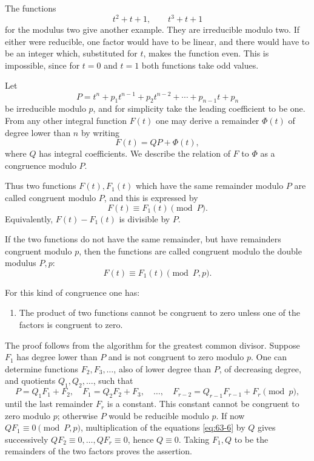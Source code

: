 \documentclass[11pt,a4paper]{article}
\begin{document}
The functions
\[
 t^2+t+1,
 \qquad t^3+t+1
\]
for the modulus two give another example.  They are irreducible modulo two.  If either were reducible, one factor would have to be linear, and there would have to be an integer which, substituted for \(t\), makes the function even.  This is impossible, since for \(t=0\) and \(t=1\) both functions take odd values.

Let
\begin{equation}\label{eq:63-3}
 P=t^n+p_1t^{n-1}+p_2t^{n-2}+\cdots+p_{n-1}t+p_n
\end{equation}
be irreducible modulo \(p\), and for simplicity take the leading coefficient to be one.  From any other integral function \(F(t)\) one may derive a remainder \(\Phi(t)\) of degree lower than \(n\) by writing
\begin{equation}\label{eq:63-4}
 F(t)=QP+\Phi(t),
\end{equation}
where \(Q\) has integral coefficients.  We describe the relation of \(F\) to \(\Phi\) as a congruence modulo \(P\).

Thus two functions \(F(t),F_1(t)\) which have the same remainder modulo \(P\) are called congruent modulo \(P\), and this is expressed by
\[
 F(t)\equiv F_1(t)\pmod P.
\]
Equivalently, \(F(t)-F_1(t)\) is divisible by \(P\).

If the two functions do not have the same remainder, but have remainders congruent modulo \(p\), then the functions are called congruent modulo the double modulus \(P,p\):
\begin{equation}\label{eq:63-5}
 F(t)\equiv F_1(t)\pmod{P,p}.
\end{equation}

For this kind of congruence one has:

\begin{enumerate}[label=\arabic*.]
\item The product of two functions cannot be congruent to zero unless one of the factors is congruent to zero.
\end{enumerate}
The proof follows from the algorithm for the greatest common divisor.  Suppose \(F_1\) has degree lower than \(P\) and is not congruent to zero modulo \(p\).  One can determine functions \(F_2,F_3,\ldots\), also of lower degree than \(P\), of decreasing degree, and quotients \(Q_1,Q_2,\ldots\), such that
\begin{equation}\label{eq:63-6}
 P=Q_1F_1+F_2,
 \quad F_1=Q_2F_2+F_3,
 \quad\ldots,
 \quad F_{r-2}=Q_{r-1}F_{r-1}+F_r
 \pmod p,
\end{equation}
until the last remainder \(F_r\) is a constant.  This constant cannot be congruent to zero modulo \(p\); otherwise \(P\) would be reducible modulo \(p\).  If now \(QF_1\equiv0\pmod{P,p}\), multiplication of the equations \eqref{eq:63-6} by \(Q\) gives successively \(QF_2\equiv0,\ldots,QF_r\equiv0\), hence \(Q\equiv0\).  Taking \(F_1,Q\) to be the remainders of the two factors proves the assertion.
\end{document}
